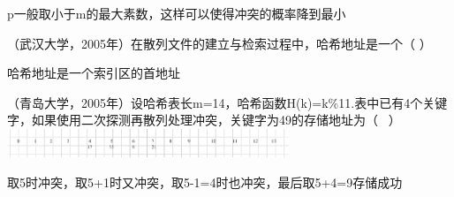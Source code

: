 \begin{solution}p一般取小于m的最大素数，这样可以使得冲突的概率降到最小
\end{solution}
\question （武汉大学，2005年）在散列文件的建立与检索过程中，哈希地址是一个（ ）
\par{}
\begin{solution}哈希地址是一个索引区的首地址
\end{solution}
\question （青岛大学，2005年）设哈希表长m=14，哈希函数H(k)=k\%11.表中已有4个关键字，如果使用二次探测再散列处理冲突，关键字为49的存储地址为（
~）
\includegraphics[width=3.33333in,height=0.33333in]{computerassets/3d96db8ff2bac40204c152331f211bb3.png}
\par{}
\begin{solution}取5时冲突，取5+1时又冲突，取5-1=4时也冲突，最后取5+4=9存储成功
\end{solution}
